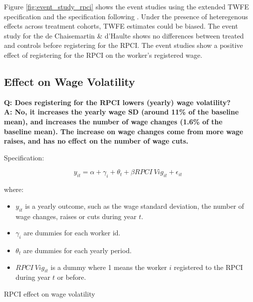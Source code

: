 \documentclass[oneside,11pt]{article}
\begin{document}
Figure \ref{fig:event_study_rpci} shows the event studies using the extended TWFE specification and the specification following \cite{de2020two}. Under the presence of heteregenous effects across treatment cohorts, TWFE estimates could be biased. The event study for the de Chaisemartin \& d'Haulte shows no differences between treated and controls before registering for the RPCI. The event studies show a positive effect of registering for the RPCI on the worker's registered wage.

\clearpage

\subsection{Effect on Wage Volatility}

\textbf{Q: Does registering for the RPCI lowers (yearly) wage volatility?}
\\
\textbf{A: No, it increases the yearly wage SD (around 11\% of the baseline mean), and increases the number of wage changes (1.6\% of the baseline mean). The increase on wage changes come from more wage raises, and has no effect on the number of wage cuts.}

Specification:

$$y_{it} = \alpha + \gamma_{i} + \theta_{t} + \beta RPCI\ Vig_{it} + \epsilon_{it}$$

where:

\begin{itemize}
    \item $y_{it}$ is a yearly outcome, such as the wage standard deviation, the number of wage changes, raises or cuts during year $t$.
    \item $\gamma_{i}$ are dummies for each worker id.
    \item $\theta_{t}$ are dummies for each yearly period.
    \item $RPCI\ Vig_{it}$ is a dummy where 1 means the worker $i$ registered to the RPCI during year $t$ or before.
\end{itemize}

\begin{table}[H]
    \caption{RPCI effect on wage volatility}
    \label{sal_cierre_sd_rpci}
    \begin{center}
    \scriptsize{}
    \end{center}
\end{table}
\end{document}

